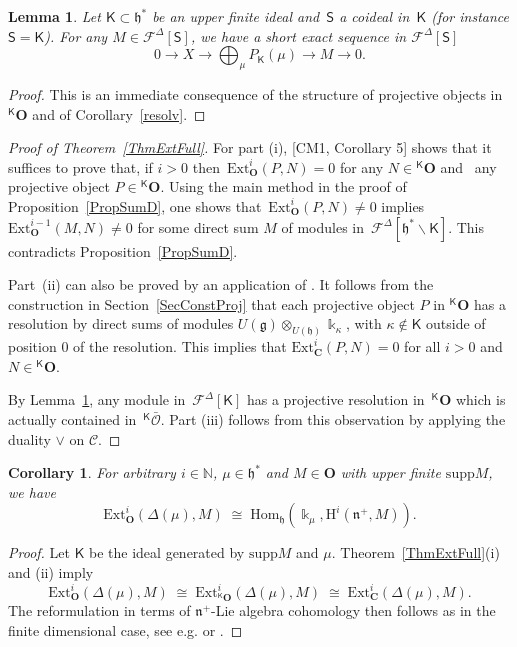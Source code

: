 \documentclass[11pt]{amsart}
\newcommand{\SSS}{\mathsf{S}}
\newcommand{\KKK}{\mathsf{K}}
\newcommand{\cF}{{\mathcal{F}}}
\newcommand{\supp}{\mathrm{supp}}
\newcommand{\cO}{\mathcal O}
\newcommand{\bO}{\mathbf{O}}
\newcommand{\bC}{\mathbf{C}}
\newcommand{\Hom}{\mathrm{Hom}}
\newcommand{\Ext}{\mathrm{Ext}}
\newcommand{\mk}{\Bbbk}
\newcommand{\cC}{\mathcal{C}}
\newcommand{\fn}{\mathfrak{n}}
\newcommand{\fg}{\mathfrak{g}}
\newcommand{\fh}{\mathfrak{h}}
\newcommand{\mN}{\mathbb{N}}
\numberwithin{equation}{section}
\theoremstyle{plain}
\newtheorem{lemma}[subsubsection]{Lemma}
\newtheorem{cor}[subsubsection]{Corollary}
\theoremstyle{remark}
\theoremstyle{remark}
\theoremstyle{construction}
\begin{document}
\begin{lemma}\label{CorNPM} Let $\KKK\subset\fh^\ast$ be an upper finite ideal and~$\SSS$ a coideal in~$\KKK$ (for instance $\SSS=\KKK$).
For any $M\in \cF^{\Delta}[\SSS]$, we have a short exact sequence in  $\cF^{\Delta}[\SSS]$
$$0\to X\to \bigoplus_{\mu}P_{\KKK}(\mu)\to M\to 0.$$
\end{lemma}
\begin{proof}
This is an immediate consequence of the structure of projective objects in ${}^{\KKK}\bO$ and {of} Corollary~\ref{resolv}.
\end{proof}


\begin{proof}[Proof of Theorem~\ref{ThmExtFull}]
For part (i), { [CM1, Corollary 5] shows that} it suffices to prove that{,} {if $i>0$ then}~$\Ext^i_{\bO}(P,N)=0$ {for any} $N\in {}^{\KKK}\bO$ and~ {any projective object} $P\in{}^{\KKK}\bO$.
 Using the main method in the proof of Proposition~\ref{PropSumD}, one shows that~$\Ext^i_{\bO}(P,N)\not=0$ implies~$\Ext^{i-1}_{\bO}(M,N)\not=0$ for some direct sum {$M$}  of modules in~$\cF^{\Delta}[\fh^\ast\backslash\KKK]$. This contradicts Proposition~\ref{PropSumD}.


Part~(ii) can also be proved by an application of \cite[Corollary~5]{CM}. It follows from the construction in Section~\ref{SecConstProj} that each projective object $P$ in ${}^{\KKK}\bO$ has a resolution by direct sums of modules $U(\fg)\otimes_{U(\fh)}\mk_\kappa$, with $\kappa\not\in\KKK$ outside of position $0$ of the resolution. This implies that $\Ext^i_{\bC}(P,N)=0$ for all $i>0$ and~$N\in{}^{\KKK}\bO$.

By Lemma~\ref{CorNPM}, any module in~$\cF^{\Delta}[\KKK]$ has a projective resolution in~${}^{\KKK}\bO$ which is actually contained in~${}^{\KKK}\bar{\cO}$.
 Part (iii) follows from this observation by applying the duality $\vee$ on $\cC$.
\end{proof}



\begin{cor}\label{CornCoh}
For arbitrary $i\in\mN$, $\mu\in\fh^\ast$ and $M\in\bO$ with upper finite $\supp M $, we have
$$\Ext^i_{\bO}(\Delta(\mu),M)\;\cong\;\Hom_{\fh}(\mk_\mu,{\mathrm H}^i(\fn^+,M)).$$
\end{cor}
\begin{proof}
Let $\KKK$ be the ideal generated by $\supp M $ and $\mu$. Theorem~\ref{ThmExtFull}(i) and (ii) imply
$$\Ext^i_{\bO}(\Delta(\mu),M)\;\cong\;\Ext^i_{{}^{\KKK}\bO}(\Delta(\mu),M)\;\cong\;\Ext^i_{\bC}(\Delta(\mu),M).$$
The reformulation in terms of $\fn^+$-Lie algebra cohomology then follows as in the finite dimensional case, see e.g. \cite[Theorem~6.15(b)]{Humphreys} or \cite[Corollary~14]{CM}.
\end{proof}
\end{document}
